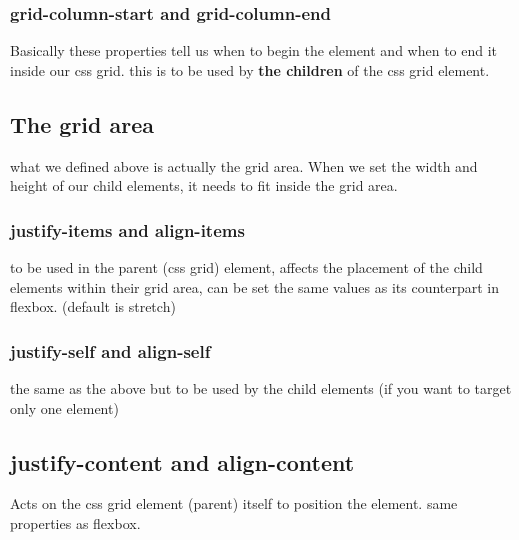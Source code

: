 \documentclass[11pt]{article}
\begin{document}
\subsubsection{grid-column-start and grid-column-end}
\label{sec:orgef8d0ec}
Basically these properties tell us when to begin the element and when to end it inside our css grid. this is to be used by \textbf{the children} of the css grid element.
\subsection{The grid area}
\label{sec:org6ad7513}
what we defined above is actually the grid area. When we set the width and height of our child elements, it needs to fit inside the grid area.
\subsubsection{justify-items and align-items}
\label{sec:org947ef96}
to be used in the parent (css grid) element, affects the placement of the child elements within their grid area, can be set the same values as its counterpart in flexbox. (default is stretch)
\subsubsection{justify-self and align-self}
\label{sec:orgbc7def4}
the same as the above but to be used by the child elements (if you want to target only one element)
\subsection{justify-content and align-content}
\label{sec:org6f7833f}
Acts on the css grid element (parent) itself to position the element. same properties as flexbox.
\end{document}
